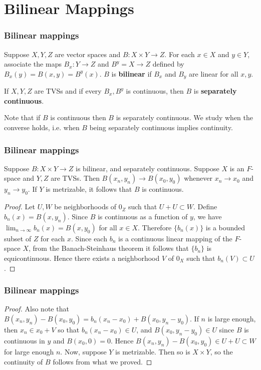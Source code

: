 \documentclass{beamer}
\begin{document}
\section{Bilinear Mappings}
\begin{frame}
\frametitle{Bilinear mappings}
\begin{Definition}
    Suppose $X,Y,Z$ are vector spaces and $B: X\times Y \to Z$. For each $x\in X$ and $y \in Y$, associate the maps $B_x: Y\to Z$ and $B^y = X \to Z$ defined by $B_x(y) = B(x,y) = B^y(x)$. $B$ is \textbf{bilinear} if $B_x$ and $B_y$ are linear for all $x,y$.
\end{Definition}
\begin{definition}
    If $X,Y,Z$ are TVSs and if every $B_x, B^y$ is continuous, then $B$ is \textbf{separately continuous}.
\end{definition}
Note that if $B$ is continuous then $B$ is separately continuous. We study when the converse holds, i.e. when $B$ being separately continuous implies continuity.
\end{frame}
\begin{frame}
\frametitle{Bilinear mappings}
\begin{theorem}
    Suppose $B:X\times Y \to Z$ is bilinear, and separately continuous. Suppose $X$ is an $F$-space and $Y,Z$ are TVSs. Then $B(x_n,y_n) \to B(x_0,y_0)$ whenever $x_n\to x_0$ and $y_n\to y_0$. If $Y$ is metrizable, it follows that $B$ is continuous.
\end{theorem}
\begin{proof}\renewcommand{\qedsymbol}{}
    Let $U,W$ be neighborhoods of $0_Z$ such that $U+U \subset W$. Define $b_n(x) = B(x,y_n)$. Since $B$ is continuous as a function of $y$, we have $\lim_{n\to\infty}b_n(x) = B(x,y_0)$ for all $x \in X$. Therefore $\{b_n(x)\}$ is a bounded subset of $Z$ for each $x$. Since each $b_n$ is a continuous linear mapping of the $F$-space $X$, from the Banach-Steinhaus theorem it follows that $\{b_n\}$ is equicontinuous. Hence there exists a neighborhood $V$ of $0_X$ such that $b_n(V) \subset U$.
\end{proof}
\end{frame}
\begin{frame}
\frametitle{Bilinear mappings}
\begin{proof}
    Also note that $B(x_n,y_n) - B(x_0,y_0) = b_n(x_n-x_0) + B(x_0,y_n-y_0)$. If $n$ is large enough, then $x_n \in x_0 + V$ so that $b_n(x_n-x_0) \in U$, and $B(x_0,y_n-y_0) \in U$ since $B$ is continuous in $y$ and $B(x_0,0) = 0$. Hence $B(x_n,y_n) - B(x_0,y_0) \in U+U \subset W$ for large enough $n$. \newline\newline Now, suppose $Y$ is metrizable. Then so is $X\times Y$, so the continuity of $B$ follows from what we proved.
\end{proof}
\end{frame}
\end{document}
